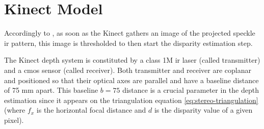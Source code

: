 \documentclass[journal]{IEEEtran}
\begin{document}
%



\section{Kinect Model}

Accordingly to \cite{landau2016kinect}, as soon as the Kinect gathers an image of the projected speckle \gls{ir} pattern, this image is thresholded to then start the disparity estimation step. 

The Kinect depth system is constituted by a class 1M \gls{ir} laser (called transmitter) and a \gls{cmos} sensor (called receiver). Both transmitter and receiver are coplanar and positioned so that their optical axes are parallel and have a baseline distance of 75 mm apart. This baseline $b=75$ distance is a crucial parameter in the depth estimation since it appears on the triangulation equation \ref{eq:stereo-triangulation} (where $f_x$ is the horizontal focal distance and $d$ is the disparity value of a given pixel).
\end{document}
